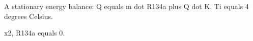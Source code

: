 A stationary energy balance:  
Q equals m dot R134a plus Q dot K.  
Ti equals 4 degrees Celsius.  

x2, R134a equals 0.